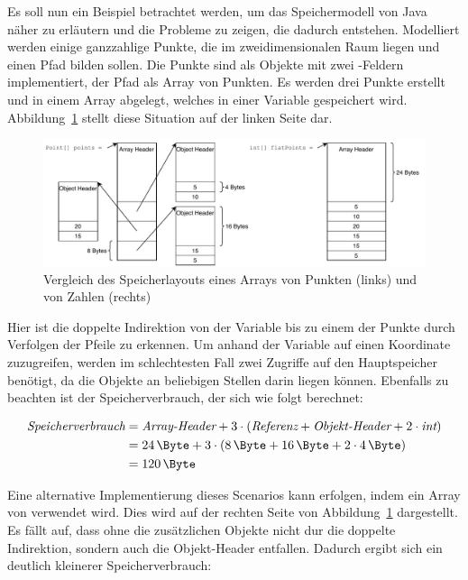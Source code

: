 Es soll nun ein Beispiel betrachtet werden, um das Speichermodell von Java näher zu erläutern und die Probleme zu zeigen, die dadurch entstehen.
Modelliert werden einige ganzzahlige Punkte, die im zweidimensionalen Raum liegen und einen Pfad bilden sollen.
Die Punkte sind als Objekte mit zwei -Feldern implementiert, der Pfad als Array von Punkten.
Es werden drei Punkte erstellt und in einem Array abgelegt, welches in einer Variable gespeichert wird.
Abbildung~\ref{fig:memory-usage} stellt diese Situation auf der linken Seite dar.

\begin{figure}[htp]
    \centering
    \includegraphics[width=\textwidth]{img/memory-usage.pdf}
    \vspace{-3ex}
    \caption{Vergleich des Speicherlayouts eines Arrays von Punkten (links) und von Zahlen (rechts)}
    \label{fig:memory-usage}
\end{figure}

Hier ist die doppelte Indirektion von der Variable bis zu einem der Punkte durch Verfolgen der Pfeile zu erkennen.
Um anhand der Variable auf einen Koordinate zuzugreifen, werden im schlechtesten Fall zwei Zugriffe auf den Hauptspeicher benötigt, da die Objekte an beliebigen Stellen darin liegen können.
Ebenfalls zu beachten ist der Speicherverbrauch, der sich wie folgt berechnet:

\begin{equation}
    \begin{split}
        \textit{Speicherverbrauch} & = \textit{Array-Header} + 3 \cdot (\textit{Referenz} + \textit{Objekt-Header} + 2 \cdot \textit{int}) \\
        & = \SI{24}{\Byte} + 3 \cdot (\SI{8}{\Byte} + \SI{16}{\Byte} + 2 \cdot \SI{4}{\Byte}) \\
        & = \SI{120}{\Byte}\label{eq:memory-usage-current} \\
    \end{split}
\end{equation}

Eine alternative Implementierung dieses Scenarios kann erfolgen, indem ein Array von  verwendet wird.
Dies wird auf der rechten Seite von Abbildung~\ref{fig:memory-usage} dargestellt.
Es fällt auf, dass ohne die zusätzlichen Objekte nicht dur die doppelte Indirektion, sondern auch die Objekt-Header entfallen.
Dadurch ergibt sich ein deutlich kleinerer Speicherverbrauch:

